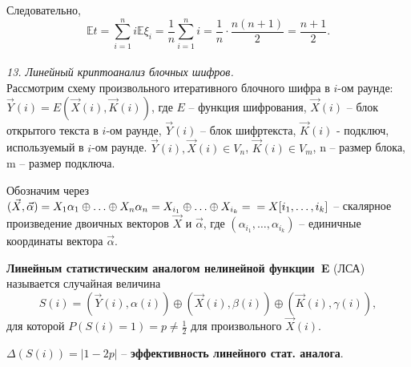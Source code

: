 Следовательно,
$$\mathbb E t = \sum_{i=1}^n i \mathbb E \xi_i = \frac{1}{n} \sum_{i=1}^n i = \frac{1}{n} \cdot \frac{n(n+1)}{2} = \frac{n+1}{2}.$$ \\

\noindent \textit{13. Линейный криптоанализ блочных шифров.} \\



Рассмотрим схему произвольного итеративного блочного шифра в $i$-ом раунде: $\vec Y(i) = E(\vec X(i), \vec K(i))$, где $E$ -- функция шифрования, $\vec X(i)$ -- блок открытого текста в $i$-ом раунде, $\vec Y (i)$ -- блок шифртекста, $\vec K(i)$ - подключ, используемый в $i$-ом раунде. $\vec Y (i), \vec X(i) \in V_n$, $\vec K (i) \in V_m$, n -- размер блока, m -- размер подключа.

Обозначим через $(\vec X, \vec \alpha) = X_1 \alpha_1 \oplus \ldots \oplus X_n \alpha_n = X_{i_1} \oplus \ldots \oplus X_{i_k} = \\ = X[i_1, \ldots ,i_k]$ -- скалярное произведение двоичных векторов $\vec X$ и $\vec \alpha$, где $(\alpha_{i_1}, \ldots , \alpha_{i_k})$ -- единичные координаты вектора $\vec \alpha$.

\textbf{Линейным статистическим аналогом нелинейной
функции~E} (ЛСА) называется случайная величина
$$S(i) = (\vec Y(i), \alpha(i)) \oplus (\vec X(i), \beta(i)) \oplus (\vec K(i), \gamma(i)),$$
для которой $P(S(i) = 1) = p \ne \frac{1}{2}$ для произвольного $\vec X(i)$.

$\Delta(S(i)) = |1 - 2p|$ -- \textbf{эффективность линейного стат. аналога}.

